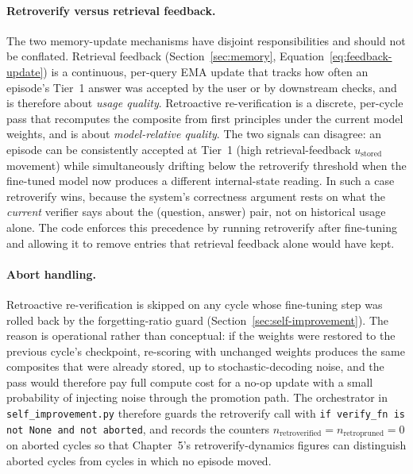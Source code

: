 \paragraph{Retroverify versus retrieval feedback.}
The two memory-update mechanisms have disjoint responsibilities and should not be conflated. Retrieval feedback (Section~\ref{sec:memory}, Equation~\ref{eq:feedback-update}) is a continuous, per-query EMA update that tracks how often an episode's Tier~1 answer was accepted by the user or by downstream checks, and is therefore about \emph{usage quality}. Retroactive re-verification is a discrete, per-cycle pass that recomputes the composite from first principles under the current model weights, and is about \emph{model-relative quality}. The two signals can disagree: an episode can be consistently accepted at Tier~1 (high retrieval-feedback $u_{\text{stored}}$ movement) while simultaneously drifting below the retroverify threshold when the fine-tuned model now produces a different internal-state reading. In such a case retroverify wins, because the system's correctness argument rests on what the \emph{current} verifier says about the (question, answer) pair, not on historical usage alone. The code enforces this precedence by running retroverify after fine-tuning and allowing it to remove entries that retrieval feedback alone would have kept.

\paragraph{Abort handling.}
Retroactive re-verification is skipped on any cycle whose fine-tuning step was rolled back by the forgetting-ratio guard (Section~\ref{sec:self-improvement}). The reason is operational rather than conceptual: if the weights were restored to the previous cycle's checkpoint, re-scoring with unchanged weights produces the same composites that were already stored, up to stochastic-decoding noise, and the pass would therefore pay full compute cost for a no-op update with a small probability of injecting noise through the promotion path. The orchestrator in \texttt{self\_improvement.py} therefore guards the retroverify call with \texttt{if verify\_fn is not None and not aborted}, and records the counters $n_{\text{retroverified}} = n_{\text{retropruned}} = 0$ on aborted cycles so that Chapter~5's retroverify-dynamics figures can distinguish aborted cycles from cycles in which no episode moved.

